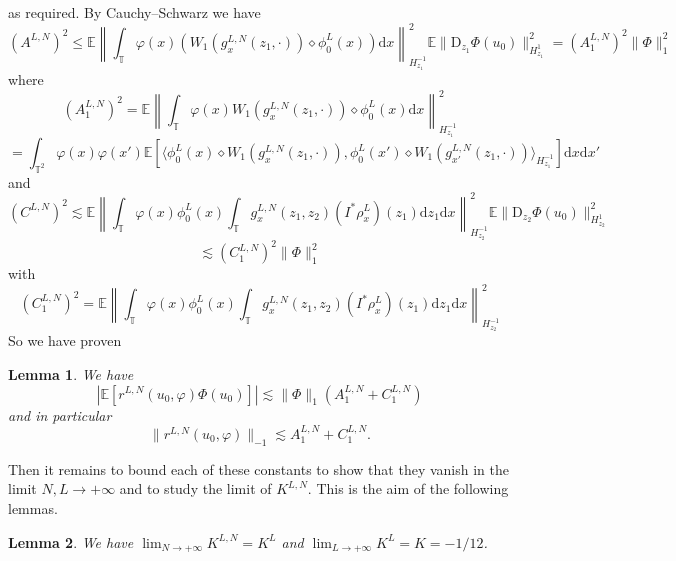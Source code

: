 \documentclass[a4paper,11pt]{article}
\newcommand{\mathD}{\mathrm{D}}
\newcommand{\mathd}{\mathrm{d}}
\newtheorem{lemma}{Lemma}
\begin{document}
as required. By Cauchy--Schwarz we have
\[ (A^{L, N})^2 \leqslant \mathbb{E} \left\| \int_{\mathbb{T}} \varphi (x)
   (W_1 (g_x^{L, N} (z_1, \cdot)) \diamond \phi_0^L (x)) \mathd x
   \right\|_{H^{- 1}_{z_1}}^2 \mathbb{E} \| \mathD_{z_1} \Phi (u_0)
   \|_{H^1_{z_1}}^2 = (A_1^{L, N})^2 \| \Phi \|_1^2 \]
where
\[ (A_1^{L, N})^2 =\mathbb{E} \left\| \int_{\mathbb{T}} \varphi (x) W_1
   (g_x^{L, N} (z_1, \cdot)) \diamond \phi_0^L (x) \mathd x \right\|_{H^{-
   1}_{z_1}}^2 \]
\[ = \int_{\mathbb{T}^2} \varphi (x) \varphi (x') \mathbb{E} \left[ \langle
   \phi_0^L (x) \diamond W_1 (g_x^{L, N} (z_1, \cdot)), \phi_0^L (x') \diamond
   W_1 (g_{x'}^{L, N} (z_1, \cdot)) \rangle_{H^{- 1}_{z_1}} \right] \mathd x
   \mathd x' \]
and
\[ (C^{L, N})^2 \lesssim \mathbb{E} \left\| \int_{\mathbb{T}} \varphi (x)
   \phi^L_0 (x) \int_{\mathbb{T}} g_x^{L, N} (z_1, z_2) (I^{\ast} \rho_x^L)
   (z_1) \mathd z_1 \mathd x \right\|_{H^{- 1}_{z_2}}^2 \mathbb{E} \|
   \mathD_{z_2} \Phi (u_0) \|_{H^1_{z_2}}^2 \]
\[ \lesssim (C_1^{L, N})^2 \| \Phi \|_1^2 \]
with
\[ (C_1^{L, N})^2 =\mathbb{E} \left\| \int_{\mathbb{T}} \varphi (x) \phi^L_0
   (x) \int_{\mathbb{T}} g_x^{L, N} (z_1, z_2) (I^{\ast} \rho_x^L) (z_1)
   \mathd z_1 \mathd x \right\|_{H^{- 1}_{z_2}}^2 \]
So we have proven

\begin{lemma}
  We have
  \[ | \mathbb{E} [r^{L, N} (u_0, \varphi) \Phi (u_0)] | \lesssim \| \Phi
     \|_1 (A_1^{L, N} + C_1^{L, N}) \]
  and in particular
  \[ \| r^{L, N} (u_0, \varphi) \|_{- 1} \lesssim A_1^{L, N} + C_1^{L, N} . \]
\end{lemma}

Then it remains to bound each of these constants to show that they vanish in
the limit $N, L \rightarrow + \infty$ and to study the limit of $K^{L, N}$.
This is the aim of the following lemmas.

\begin{lemma}
  We have $\lim_{N \rightarrow + \infty} K^{L, N} = K^L$ and $\lim_{L
  \rightarrow + \infty} K^L = K = - 1 / 12$.
\end{lemma}
\end{document}

